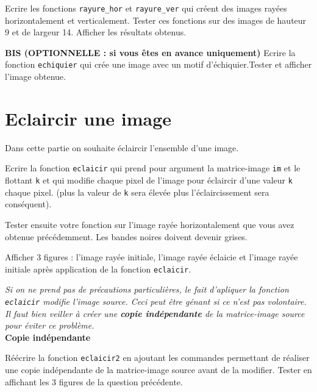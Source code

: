 \begin{question}
Ecrire les fonctions \texttt{rayure\_hor} et \texttt{rayure\_ver} qui créent des images rayées horizontalement et verticalement. Tester ces fonctions sur des images de hauteur 9 et de largeur 14. Afficher les résultats obtenus.
\end{question}


\begin{question}
\textbf{BIS (OPTIONNELLE : si vous êtes en avance uniquement)} Ecrire la fonction \texttt{echiquier} qui crée une image avec un motif d'échiquier.Tester et afficher l'image obtenue.
\end{question}


\section*{Eclaircir une image}
Dans cette partie on souhaite éclaircir l'ensemble d'une image.

\begin{question}
Ecrire la fonction \texttt{eclaicir} qui prend pour argument la matrice-image \texttt{im} et le flottant \texttt{k} et qui modifie chaque pixel de l'image pour éclaircir d'une valeur \texttt{k} chaque pixel. (plus la valeur de \texttt{k} sera élevée plus l'éclaircissement sera conséquent).

Tester ensuite votre fonction sur l'image rayée horizontalement que vous avez obtenue précédemment. Les bandes noires doivent devenir grises. 

Afficher 3 figures : l'image rayée initiale, l'image rayée éclaicie et l'image rayée initiale après application de la fonction \texttt{eclaicir}.  
\end{question}


\textit{Si on ne prend pas de précautions particulières, le fait d'apliquer la fonction \texttt{eclaicir} modifie l'image source. Ceci peut être génant si ce n'est pas volontaire. Il faut bien veiller à créer une \textbf{copie indépendante} de la matrice-image source pour éviter ce problème.}\\

\textbf{Copie indépendante}

\begin{question}
Réécrire la fonction \texttt{eclaicir2} en ajoutant les commandes permettant de réaliser une copie indépendante de la matrice-image source avant de la modifier. Tester en affichant les 3 figures de la question précédente.
\end{question}


